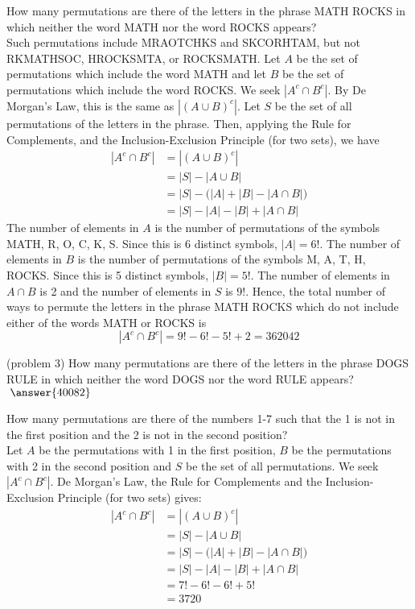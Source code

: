 \documentclass[handout]{ximera}
\begin{document}
\begin{example}[example 3]
How many permutations are there of the letters in the phrase MATH ROCKS in which neither 
the word MATH nor the word ROCKS appears?\\
Such permutations include MRAOTCHKS and SKCORHTAM, but not RKMATHSOC, HROCKSMTA, or ROCKSMATH.
Let $A$ be the set of permutations which include the word MATH and let $B$ be the set of permutations which include the word
ROCKS.  We seek $|A^c \cap B^c|$. By De Morgan's Law, this is the same as $|(A \cup B)^c|$. 
Let $S$ be the set of all permutations of the letters in the phrase. Then, applying the Rule for Complements,
and the Inclusion-Exclusion Principle (for two sets), we have
\begin{align*}
|A^c \cap B^c| &= |(A \cup B)^c|\\
               &= |S| - |A\cup B|\\
               &= |S| - \Big(|A| + |B| -|A\cap B|\Big)\\
               &= |S| - |A| - |B| + |A\cap B|
\end{align*}
The number of elements in $A$ is the number of permutations of the symbols MATH, R, O, C, K, S.  
Since this is 6 distinct symbols, $|A| = 6!$. The number of elements in $B$ is the number of 
permutations of the symbols M, A, T, H, ROCKS.  
Since this is 5 distinct symbols, $|B| = 5!$. The number of elements in $A \cap B$ is 2 and the number of elements in $S$
is $9!$. Hence, the total number of ways to permute the letters in the phrase MATH ROCKS which do not 
include either of the words MATH or ROCKS is
\[
|A^c \cap B^c| = 9! - 6! - 5! + 2 = 362042
\]
\end{example}


\begin{problem}(problem 3)
How many permutations are there of the letters in the phrase DOGS RULE in which neither 
the word DOGS nor the word RULE appears? $\; \answer{40082}$
\end{problem}

\begin{example}[example 4]
How many permutations are there of the numbers 1-7 such that the 1 is not in the first 
position and the 2 is not in the second position?\\
Let $A$ be the permutations with 1 in the first position, $B$ be the permutations with 2 in the 
second position and $S$ be the set of all permutations. 
We seek $|A^c \cap B^c|$. 
De Morgan's Law, the Rule for Complements and the Inclusion-Exclusion Principle (for two sets) gives:
\begin{align*}
|A^c \cap B^c| &= |(A \cup B)^c|\\
               &= |S| - |A\cup B|\\
               &= |S| - \Big(|A| + |B| - |A\cap B|\Big)\\
               &= |S| - |A| - |B| + |A\cap B|\\
               &= 7! - 6! - 6! + 5!\\
               &= 3720
\end{align*}



\end{example}
\end{document}
